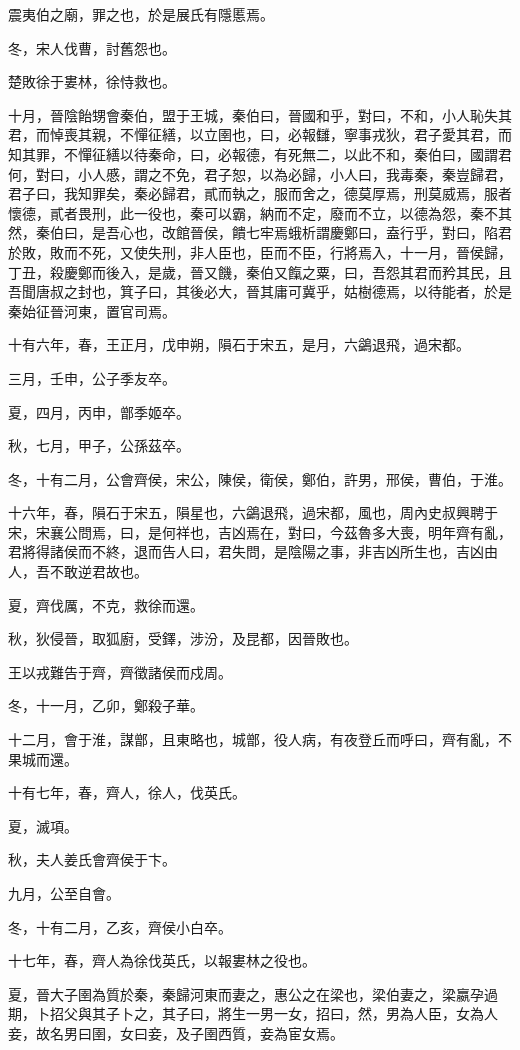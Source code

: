\begin{pinyinscope}
震夷伯之廟，罪之也，於是展氏有隱慝焉。

冬，宋人伐曹，討舊怨也。

楚敗徐于婁林，徐恃救也。

十月，晉陰飴甥會秦伯，盟于王城，秦伯曰，晉國和乎，對曰，不和，小人恥失其君，而悼喪其親，不憚征繕，以立圉也，曰，必報讎，寧事戎狄，君子愛其君，而知其罪，不憚征繕以待秦命，曰，必報德，有死無二，以此不和，秦伯曰，國謂君何，對曰，小人慼，謂之不免，君子恕，以為必歸，小人曰，我毒秦，秦豈歸君，君子曰，我知罪矣，秦必歸君，貳而執之，服而舍之，德莫厚焉，刑莫威焉，服者懷德，貳者畏刑，此一役也，秦可以霸，納而不定，廢而不立，以德為怨，秦不其然，秦伯曰，是吾心也，改館晉侯，饋七牢焉蛾析謂慶鄭曰，盍行乎，對曰，陷君於敗，敗而不死，又使失刑，非人臣也，臣而不臣，行將焉入，十一月，晉侯歸，丁丑，殺慶鄭而後入，是歲，晉又饑，秦伯又餼之粟，曰，吾怨其君而矜其民，且吾聞唐叔之封也，箕子曰，其後必大，晉其庸可冀乎，姑樹德焉，以待能者，於是秦始征晉河東，置官司焉。

十有六年，春，王正月，戊申朔，隕石于宋五，是月，六鷁退飛，過宋都。

三月，壬申，公子季友卒。

夏，四月，丙申，鄫季姬卒。

秋，七月，甲子，公孫茲卒。

冬，十有二月，公會齊侯，宋公，陳侯，衛侯，鄭伯，許男，邢侯，曹伯，于淮。

十六年，春，隕石于宋五，隕星也，六鷁退飛，過宋都，風也，周內史叔興聘于宋，宋襄公問焉，曰，是何祥也，吉凶焉在，對曰，今茲魯多大喪，明年齊有亂，君將得諸侯而不終，退而告人曰，君失問，是陰陽之事，非吉凶所生也，吉凶由人，吾不敢逆君故也。

夏，齊伐厲，不克，救徐而還。

秋，狄侵晉，取狐廚，受鐸，涉汾，及昆都，因晉敗也。

王以戎難告于齊，齊徵諸侯而戍周。

冬，十一月，乙卯，鄭殺子華。

十二月，會于淮，謀鄫，且東略也，城鄫，役人病，有夜登丘而呼曰，齊有亂，不果城而還。

十有七年，春，齊人，徐人，伐英氏。

夏，滅項。

秋，夫人姜氏會齊侯于卞。

九月，公至自會。

冬，十有二月，乙亥，齊侯小白卒。

十七年，春，齊人為徐伐英氏，以報婁林之役也。

夏，晉大子圉為質於秦，秦歸河東而妻之，惠公之在梁也，梁伯妻之，梁嬴孕過期，卜招父與其子卜之，其子曰，將生一男一女，招曰，然，男為人臣，女為人妾，故名男曰圉，女曰妾，及子圉西質，妾為宦女焉。


\end{pinyinscope}
